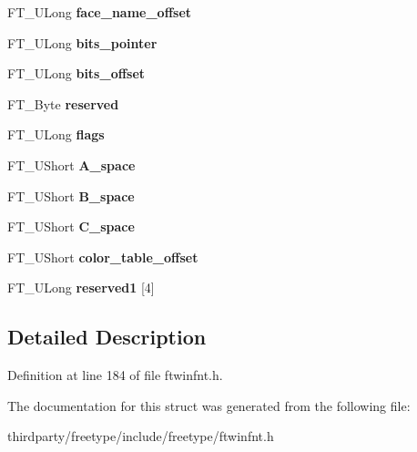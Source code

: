 \begin{DoxyCompactItemize}
F\+T\+\_\+\+U\+Long {\bfseries face\+\_\+name\+\_\+offset}
\item 
\mbox{\label{struct_f_t___win_f_n_t___header_rec___aadce0638c78fbf4ec2566ea9ef49d528}} 
F\+T\+\_\+\+U\+Long {\bfseries bits\+\_\+pointer}
\item 
\mbox{\label{struct_f_t___win_f_n_t___header_rec___abcdf521978a3eb401ed6d1db20e9e16a}} 
F\+T\+\_\+\+U\+Long {\bfseries bits\+\_\+offset}
\item 
\mbox{\label{struct_f_t___win_f_n_t___header_rec___a802cb51af97c1f9c556d1db71e2ea51a}} 
F\+T\+\_\+\+Byte {\bfseries reserved}
\item 
\mbox{\label{struct_f_t___win_f_n_t___header_rec___ac3230b8c51250b5c1e48c8e38c44d6f6}} 
F\+T\+\_\+\+U\+Long {\bfseries flags}
\item 
\mbox{\label{struct_f_t___win_f_n_t___header_rec___ad97f5f84ac213c1fb59ceeafc689f381}} 
F\+T\+\_\+\+U\+Short {\bfseries A\+\_\+space}
\item 
\mbox{\label{struct_f_t___win_f_n_t___header_rec___aabd41a485124b6c4220fc4622525608e}} 
F\+T\+\_\+\+U\+Short {\bfseries B\+\_\+space}
\item 
\mbox{\label{struct_f_t___win_f_n_t___header_rec___a1173b4d5c809db01edf4ff2185e1d43b}} 
F\+T\+\_\+\+U\+Short {\bfseries C\+\_\+space}
\item 
\mbox{\label{struct_f_t___win_f_n_t___header_rec___a83fa51bfd7fe814f8264416204701c60}} 
F\+T\+\_\+\+U\+Short {\bfseries color\+\_\+table\+\_\+offset}
\item 
\mbox{\label{struct_f_t___win_f_n_t___header_rec___af01de9742608fb7a2a603d062f3783e3}} 
F\+T\+\_\+\+U\+Long {\bfseries reserved1} \mbox{[}4\mbox{]}
\end{DoxyCompactItemize}


\subsection{Detailed Description}


Definition at line 184 of file ftwinfnt.\+h.



The documentation for this struct was generated from the following file\+:\begin{DoxyCompactItemize}
\item 
thirdparty/freetype/include/freetype/ftwinfnt.\+h\end{DoxyCompactItemize}
